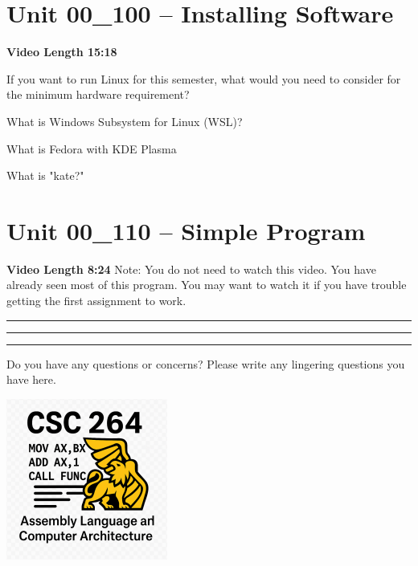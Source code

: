 \documentclass[letterpaper,12pt]{exam}
\newcommand{\unit}{Unit 00}
\begin{document}
\begin{questions}
  \section*{\unit\_100 -- Installing Software}
  \par{\selectfont\textbf{Video Length 15:18}}
  \begin{samepage}
      \question If you want to run Linux for this semester, what would you need to consider for the minimum hardware requirement?

      \vspace{5mm}
  \end{samepage}
\begin{samepage}
    \question What is Windows Subsystem for Linux (WSL)?
    \vspace{5mm}
\end{samepage}
\par
 \begin{samepage}
     \question What is Fedora with KDE Plasma
     \vspace{5mm}
 \end{samepage}
 \par
  \begin{samepage}
      \question What is "kate?"
      \vspace{5mm}
  \end{samepage}
  \par
   \section*{\unit\_110 -- Simple Program}
   \par{\selectfont\textbf{Video Length 8:24}}
   Note:  You do not need to watch this video.  You have already seen most of this program.  You may want to watch it if you have trouble getting the first assignment to work.
   
   \rule{0.5\textwidth}{.4pt} %
  \rule{0.5\textwidth}{.4pt} %
 

\begin{center}
    \rule{0.5\textwidth}{.4pt}
\end{center}
Do you have any questions or concerns? Please write any lingering questions you have here.

\end{questions}
\vfill
\begin{center}
\includegraphics{../csc264Logo}
\end{center}
\end{document}
